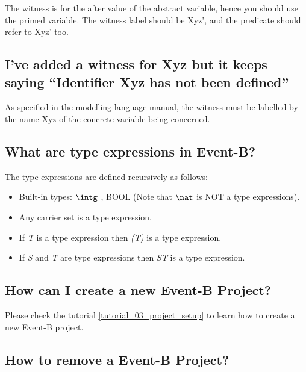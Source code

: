 The witness is for the after value of the abstract variable, hence you should use the primed variable. The witness label should be \textsf{Xyz'}, and the predicate should refer to \textsf{Xyz'} too. 

\subsection{I've added a witness for \textsf{Xyz} but it keeps saying ``Identifier \textsf{Xyz} has not been defined''}

As specified in the \href{http://wiki.event-b.org/index.php/Witnesses_(Modelling_Language)}{modelling language manual}, the witness must be labelled by the name \textsf{Xyz} of the concrete variable being concerned.

\subsection{What are type expressions in Event-B?}

The type expressions are defined recursively as follows: 

\begin{itemize}
	\item Built-in types: $\intg$ , BOOL (Note that $\nat$ is NOT a type expressions). 
	\item Any carrier set is a type expression. 
	\item If \textit{T} is a type expression then \textit{(T)} is a type expression. 
	\item If \textit{S} and \textit{T} are type expressions then \textit{ST} is a type expression. 
\end{itemize} 

\subsection{How can I create a new Event-B Project?}


Please check the tutorial \ref{tutorial_03_project_setup} to learn how to create a new Event-B project.

\subsection{How to remove a Event-B Project?}


